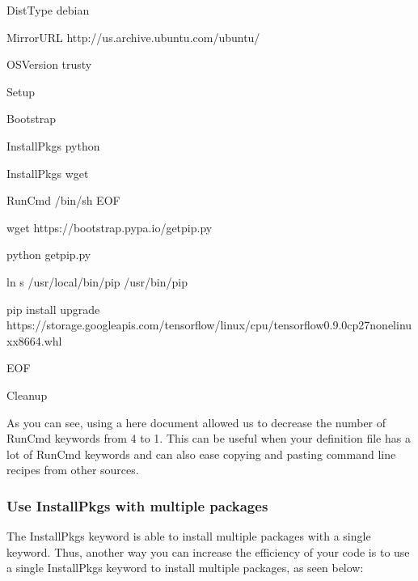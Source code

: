 \documentclass[letterpaper,10pt,english]{sphinxmanual}
\begin{document}
%
\begin{sphinxVerbatim}[commandchars=\\\{\}]
DistType \PYGZdq{}debian\PYGZdq{}

MirrorURL \PYGZdq{}http://us.archive.ubuntu.com/ubuntu/\PYGZdq{}

OSVersion \PYGZdq{}trusty\PYGZdq{}


Setup

Bootstrap


InstallPkgs python

InstallPkgs wget

RunCmd /bin/sh \PYGZlt{}\PYGZlt{}EOF

wget https://bootstrap.pypa.io/get\PYGZhy{}pip.py

python get\PYGZhy{}pip.py

ln \PYGZhy{}s /usr/local/bin/pip /usr/bin/pip

pip install \PYGZhy{}\PYGZhy{}upgrade https://storage.googleapis.com/tensorflow/linux/cpu/tensorflow\PYGZhy{}0.9.0\PYGZhy{}cp27\PYGZhy{}none\PYGZhy{}linux\PYGZus{}x86\PYGZus{}64.whl

EOF


Cleanup
\end{sphinxVerbatim}

As you can see, using a here document allowed us to decrease the number of RunCmd keywords from 4 to 1. This can be useful when your definition file
has a lot of RunCmd keywords and can also ease copying and pasting command line recipes from other sources.


\subsubsection{Use InstallPkgs with multiple packages}
\label{\detokenize{appendix:use-installpkgs-with-multiple-packages}}
The InstallPkgs keyword is able to install multiple packages with a single keyword. Thus, another way you can increase the efficiency of your code is to
use a single InstallPkgs keyword to install multiple packages, as seen below:
\end{document}
